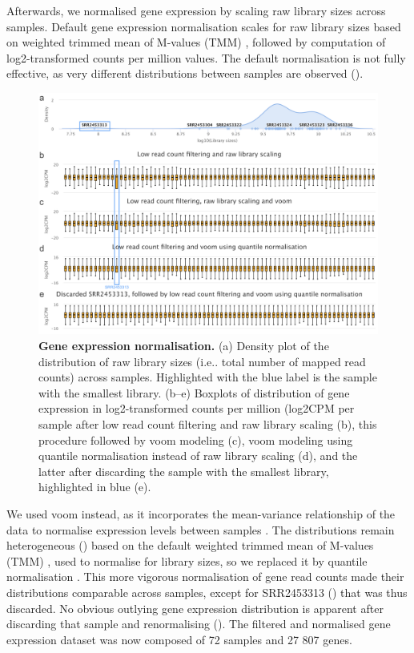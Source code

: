 Afterwards, we normalised gene expression by scaling raw library sizes across samples. Default gene expression normalisation scales for raw library sizes based on weighted trimmed mean of M-values (TMM) \cite{robinson:2010wx}, followed by computation of log2-transformed counts per million values. The default normalisation is not fully effective, as very different distributions between samples are observed ().

\begin{figure}[!h]
  \includegraphics[width=1\textwidth]{images/psichomics/1-gene-expr-normalisation}
  \centering
  \caption[Gene expression normalisation]{\textbf{Gene expression normalisation.} (a) Density plot of the distribution of raw library sizes (i.e.. total number of mapped read counts) across samples. Highlighted with the blue label is the sample with the smallest library. (b–e) Boxplots of distribution of gene expression in log2-transformed counts per million (log2CPM per sample after low read count filtering and raw library scaling (b), this procedure followed by voom modeling (c), voom modeling using quantile normalisation instead of raw library scaling (d), and the latter after discarding the sample with the smallest library, highlighted in blue (e).}
  \label{fig:psichomics-ge-norm}
\end{figure}

We used voom instead, as it incorporates the mean-variance relationship of the data to normalise expression levels between samples \cite{ritchie:2015tm}. The distributions remain heterogeneous () based on the default weighted trimmed mean of M-values (TMM) \cite{robinson:2010wx}, used to normalise for library sizes, so we replaced it by quantile normalisation \cite{ritchie:2015tm}. This more vigorous normalisation of gene read counts made their distributions comparable across samples, except for SRR2453313 () that was thus discarded. No obvious outlying gene expression distribution is apparent after discarding that sample and renormalising (). The filtered and normalised gene expression dataset was now composed of 72 samples and 27 807 genes.


